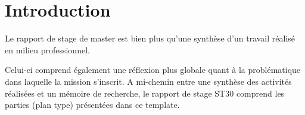 \chapter*{Introduction}
\label{sec:intro}

Le rapport de stage de master est bien plus qu’une synthèse d’un travail réalisé en milieu professionnel.

Celui-ci comprend également une réflexion plus globale quant à la problématique dans laquelle la mission s’inscrit. A mi-chemin entre une synthèse des activités réalisées et un mémoire de recherche, le rapport de stage ST30 comprend les parties (plan type) présentées dans ce template. \\

\lipsum[1-2]
    
